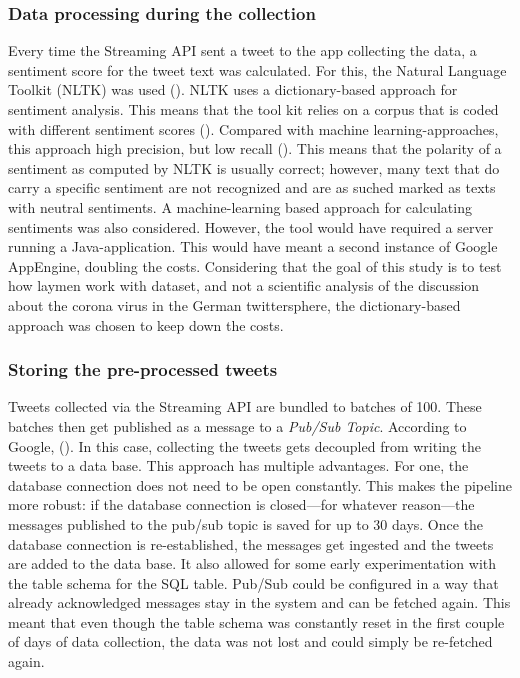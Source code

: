 \subsubsection{Data processing during the collection}
Every time the Streaming API sent a tweet to the app collecting the data, a sentiment score for the tweet text was calculated. For this, the Natural Language Toolkit (NLTK) was used (\cite{loper2002nltk}). NLTK uses a dictionary-based approach for sentiment analysis. This means that the tool kit relies on a corpus that is coded with different sentiment scores (\cite{haselmayer2017sentiment}). Compared with machine learning-approaches, this approach high precision, but low recall (\cite{soroka2015}). This means that the polarity of a sentiment as computed by NLTK is usually correct; however, many text that do carry a specific sentiment are not recognized and are as suched marked as texts with neutral sentiments.
A machine-learning based approach for calculating sentiments was also considered. However, the tool would have required a server running a Java-application. This would have meant a second instance of Google AppEngine, doubling the costs. Considering that the goal of this study is to test how laymen work with dataset, and not a scientific analysis of the discussion about the corona virus in the German twittersphere, the dictionary-based approach was chosen to keep down the costs.

\subsubsection{Storing the pre-processed tweets}
Tweets collected via the Streaming API are bundled to batches of 100. These batches then get published as a message to a \emph{Pub/Sub Topic}. According to Google,  (\cite{google2020a}). In this case, collecting the tweets gets decoupled from writing the tweets to a data base. This approach has multiple advantages. For one, the database connection does not need to be open constantly. This makes the pipeline more robust: if the database connection is closed---for whatever reason---the messages published to the pub/sub topic is saved for up to 30 days. Once the database connection is re-established, the messages get ingested and the tweets are added to the data base. It also allowed for some early experimentation with the table schema for the SQL table. Pub/Sub could be configured in a way that already acknowledged messages stay in the system and can be fetched again. This meant that even though the table schema was constantly reset in the first couple of days of data collection, the data was not lost and could simply be re-fetched again.

